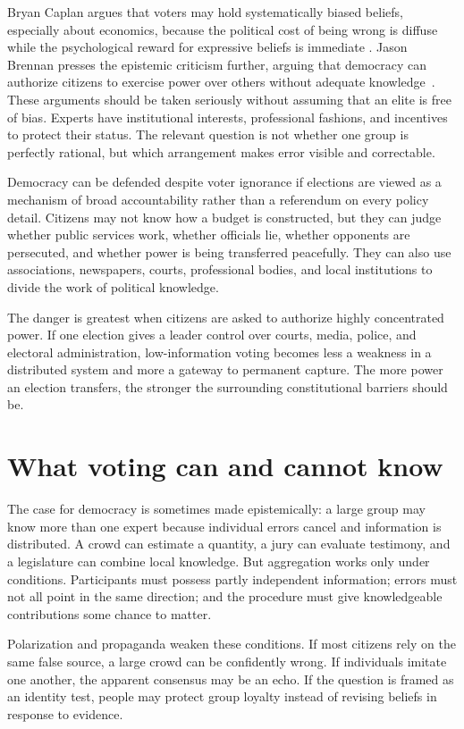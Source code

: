 ﻿\documentclass[12pt,a4paper]{book}
\begin{document}
Bryan Caplan argues that voters may hold systematically biased beliefs,
especially about economics, because the political cost of being wrong is
diffuse while the psychological reward for expressive beliefs is immediate
\cite{Caplan2007}.  Jason Brennan presses the epistemic criticism further,
arguing that democracy can authorize citizens to exercise power over others
without adequate knowledge~\cite{Brennan2016}.  These arguments should be
taken seriously without assuming that an elite is free of bias.  Experts
have institutional interests, professional fashions, and incentives to
protect their status.  The relevant question is not whether one group is
perfectly rational, but which arrangement makes error visible and
correctable.

Democracy can be defended despite voter ignorance if elections are viewed
as a mechanism of broad accountability rather than a referendum on every
policy detail.  Citizens may not know how a budget is constructed, but they
can judge whether public services work, whether officials lie, whether
opponents are persecuted, and whether power is being transferred peacefully.
They can also use associations, newspapers, courts, professional bodies,
and local institutions to divide the work of political knowledge.

The danger is greatest when citizens are asked to authorize highly
concentrated power.  If one election gives a leader control over courts,
media, police, and electoral administration, low-information voting becomes
less a weakness in a distributed system and more a gateway to permanent
capture.  The more power an election transfers, the stronger the surrounding
constitutional barriers should be.

\section{What voting can and cannot know}

The case for democracy is sometimes made epistemically: a large group may
know more than one expert because individual errors cancel and information
is distributed.  A crowd can estimate a quantity, a jury can evaluate
testimony, and a legislature can combine local knowledge.  But aggregation
works only under conditions.  Participants must possess partly independent
information; errors must not all point in the same direction; and the
procedure must give knowledgeable contributions some chance to matter.

Polarization and propaganda weaken these conditions.  If most citizens rely
on the same false source, a large crowd can be confidently wrong.  If
individuals imitate one another, the apparent consensus may be an echo.  If
the question is framed as an identity test, people may protect group loyalty
instead of revising beliefs in response to evidence.
\end{document}
